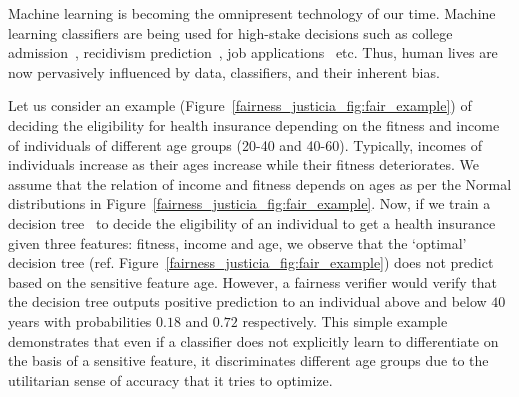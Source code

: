 \label{chapter:justicia}
Machine learning is becoming the omnipresent technology of our time. Machine learning classifiers are being used for high-stake decisions such as college admission~\cite{martinez2021using}, recidivism prediction~\cite{tollenaar2013method}, job applications~\cite{ajunwa2016hiring} etc. Thus, human lives are now pervasively influenced by data, classifiers, and their inherent bias.

\begin{example}\label{fairness_justicia_example:intro}
\normalfont
Let us consider an example (Figure~\ref{fairness_justicia_fig:fair_example}) of deciding the eligibility for health insurance depending on the fitness and income of individuals of different age groups (20-40 and 40-60). Typically, incomes of individuals increase as their ages increase while their fitness deteriorates. We assume that the relation of income and fitness depends on ages as per the Normal distributions in Figure~\ref{fairness_justicia_fig:fair_example}. Now, if we train a decision tree~\cite{narodytska2018learning} to decide the eligibility of an individual to get a health insurance given three features: fitness, income and age, we observe that the `optimal' decision tree (ref. Figure~\ref{fairness_justicia_fig:fair_example}) does not predict based on the sensitive feature age. However, a fairness verifier would verify that the decision tree outputs positive prediction to an individual above and below $40$ years with probabilities $0.18$ and $0.72$ respectively. This simple example demonstrates that even if a classifier does not explicitly learn to differentiate on the basis of a sensitive feature, it discriminates different age groups due to the utilitarian sense of accuracy that it tries to optimize.
\end{example}

